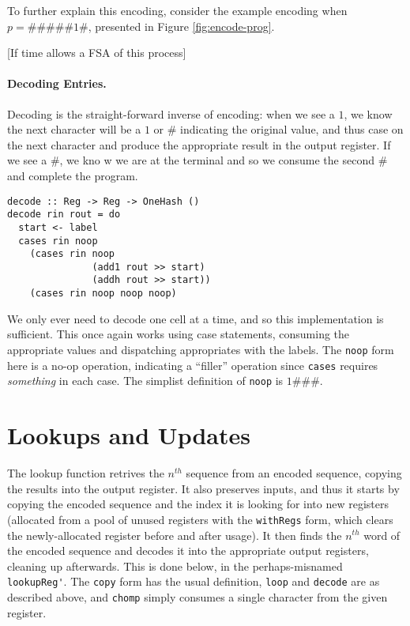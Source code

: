 \documentclass[10pt, preprint, nocopyrightspace]{sigplanconf}
\newcommand{\figref}[1]{Figure \ref{#1}}
\begin{document}
To further explain this encoding, consider the example encoding when $p =
\#\#\#\#\#1\#$, presented in \figref{fig:encode-prog}. 

[If time allows a FSA of this process]


\paragraph{Decoding Entries.}

Decoding is the straight-forward inverse of encoding: when we see a $1$, we know
the next character will be a $1$ or $\#$ indicating the original value, and thus
case on the next character and produce the appropriate result in the output
register. If we see a $\#$, we kno w we are at the terminal and so we consume
the second $\#$ and complete the program. 
\begin{lstlisting}
decode :: Reg -> Reg -> OneHash ()
decode rin rout = do
  start <- label
  cases rin noop
    (cases rin noop
               (add1 rout >> start)
               (addh rout >> start))
    (cases rin noop noop noop)
\end{lstlisting}
We only ever need to decode one cell at a time, and so this implementation is
sufficient. This once again works using case statements, consuming the appropriate
values and dispatching appropriates with the labels. The \lstinline{noop} form here
is a no-op operation, indicating a ``filler'' operation since \lstinline{cases}
requires \emph{something} in each case. The simplist definition of \lstinline{noop} is
$1\#\#\#$.

\section{Lookups and Updates}

The lookup function retrives the $n^{th}$ sequence from an encoded sequence,
copying the results into the output register. It also preserves inputs, and thus
it starts by copying the encoded sequence and the index it is looking for into
new registers (allocated from a pool of unused registers with the
\lstinline{withRegs} form, which clears the newly-allocated register before and
after usage). It then finds the $n^{th}$ word of the encoded sequence and
decodes it into the appropriate output registers, cleaning up afterwards. This
is done below, in the perhaps-misnamed \lstinline{lookupReg'}. The \lstinline{copy}
form has the usual definition, \lstinline{loop} and \lstinline{decode} are as described
above, and \lstinline{chomp} simply consumes a single character from the given register.
\end{document}
